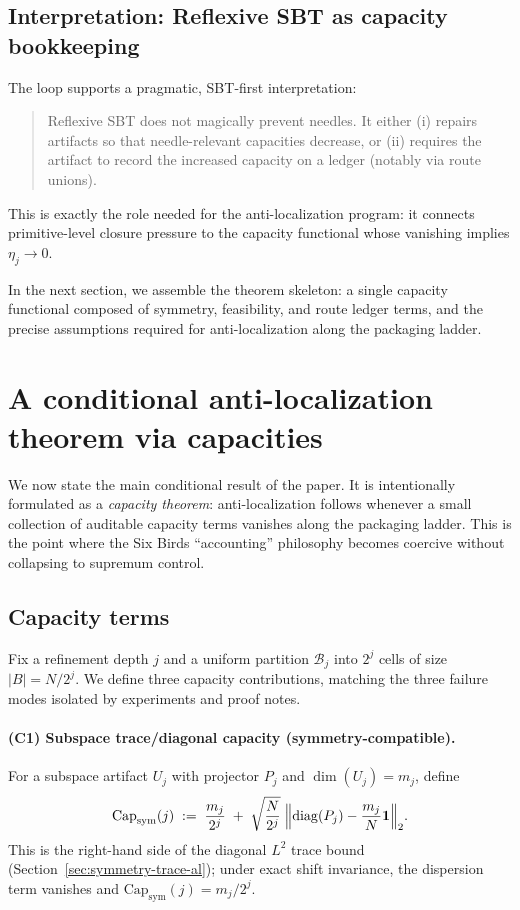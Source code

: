 \documentclass[11pt]{article}
\theoremstyle{plain}
\theoremstyle{definition}
\theoremstyle{remark}
\begin{document}
\subsection{Interpretation: Reflexive SBT as capacity bookkeeping}\label{subsec:interpretation-capacity}

The loop supports a pragmatic, SBT-first interpretation:
\begin{quote}
Reflexive SBT does not magically prevent needles.
It either (i) repairs artifacts so that needle-relevant capacities decrease, or (ii) requires the artifact to record the increased capacity on a ledger (notably via route unions).
\end{quote}
This is exactly the role needed for the anti-localization program:
it connects primitive-level closure pressure to the capacity functional whose vanishing implies \(\eta_j\to 0\).

In the next section, we assemble the theorem skeleton: a single capacity functional composed of symmetry, feasibility, and route ledger terms, and the precise assumptions required for anti-localization along the packaging ladder.
 \section{A conditional anti-localization theorem via capacities}\label{sec:capacity-theorem}

We now state the main conditional result of the paper.
It is intentionally formulated as a \emph{capacity theorem}: anti-localization follows whenever a small collection of auditable capacity terms vanishes along the packaging ladder.
This is the point where the Six Birds ``accounting'' philosophy becomes coercive without collapsing to supremum control.

\subsection{Capacity terms}\label{subsec:capacity_terms}

Fix a refinement depth \(j\) and a uniform partition \(\mathcal{B}_j\) into \(2^j\) cells of size \(|B|=N/2^j\).
We define three capacity contributions, matching the three failure modes isolated by experiments and proof notes.

\paragraph{(C1) Subspace trace/diagonal capacity (symmetry-compatible).}
For a subspace artifact \(U_j\) with projector \(P_j\) and \(\dim(U_j)=m_j\), define
\begin{equation}\label{eq:Cap_sym_def}
\mathrm{Cap}_{\mathrm{sym}}(j)
\;:=\;
\frac{m_j}{2^j}
\;+\;
\sqrt{\frac{N}{2^j}}\;\Bigl\|\mathrm{diag}(P_j)-\frac{m_j}{N}\mathbf{1}\Bigr\|_2.
\end{equation}
This is the right-hand side of the diagonal \(L^2\) trace bound (Section~\ref{sec:symmetry-trace-al}); under exact shift invariance, the dispersion term vanishes and \(\mathrm{Cap}_{\mathrm{sym}}(j)=m_j/2^j\).
\end{document}
